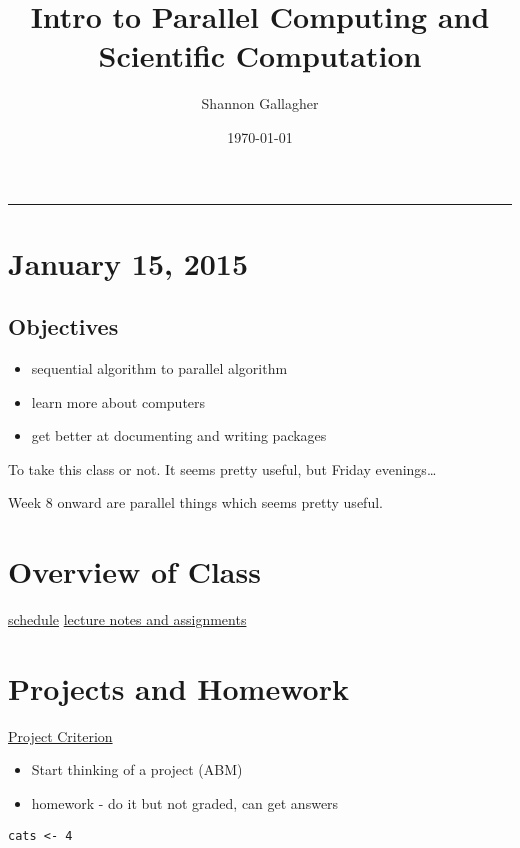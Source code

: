 \documentclass[11pt]{article}
\title{Intro to Parallel Computing and Scientific Computation}
\author{Shannon Gallagher}
\date{\today}
\begin{document}
\maketitle

\setcounter{tocdepth}{3}
\tableofcontents
\vspace*{1cm}
\hrule

\section{January 15, 2015}
\label{sec-1}
\subsection{Objectives}
\label{sec-1-1}

\begin{itemize}
\item sequential algorithm to parallel algorithm
\item learn more about computers
\item get better at documenting and writing packages
\end{itemize}

To take this class or not.  It seems pretty useful, but Friday evenings\ldots{}  

Week 8 onward are parallel things which seems pretty useful.
\section{Overview of Class}
\label{sec-2}

  \href{http://www.math.cmu.edu/~florin/M21-765/}{schedule}
  \href{http://www.math.cmu.edu/~florin/M21-765/slides/index.html}{lecture notes and assignments}
  
\section{Projects and Homework}
\label{sec-3}

  \href{http://www.math.cmu.edu/~florin/M21-765/homeworks.html}{Project Criterion}
\begin{itemize}
\item Start thinking of a project (ABM)
\item homework - do it but not graded, can get answers
\end{itemize}
    

\begin{verbatim}
cats <- 4
\end{verbatim}
\end{document}
